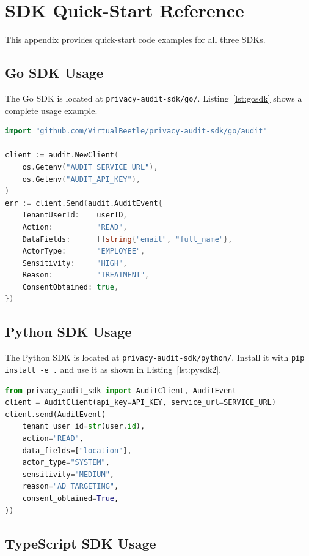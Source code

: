 \documentclass[a4paper,12pt,onecolumn]{report}
\begin{document}
\chapter{SDK Quick-Start Reference}

This appendix provides quick-start code examples for all three SDKs.

\section{Go SDK Usage}

The Go SDK is located at \texttt{privacy-audit-sdk/go/}.
Listing~\ref{lst:gosdk} shows a complete usage example.

\begin{lstlisting}[language=Go, caption={Go SDK initialisation and event submission}, label={lst:gosdk}]
import "github.com/VirtualBeetle/privacy-audit-sdk/go/audit"

client := audit.NewClient(
    os.Getenv("AUDIT_SERVICE_URL"),
    os.Getenv("AUDIT_API_KEY"),
)
err := client.Send(audit.AuditEvent{
    TenantUserId:    userID,
    Action:          "READ",
    DataFields:      []string{"email", "full_name"},
    ActorType:       "EMPLOYEE",
    Sensitivity:     "HIGH",
    Reason:          "TREATMENT",
    ConsentObtained: true,
})
\end{lstlisting}

\section{Python SDK Usage}

The Python SDK is located at \texttt{privacy-audit-sdk/python/}.
Install it with \texttt{pip install -e .} and use it as shown in Listing~\ref{lst:pysdk2}.

\begin{lstlisting}[language=Python, caption={Python SDK event submission}, label={lst:pysdk2}]
from privacy_audit_sdk import AuditClient, AuditEvent
client = AuditClient(api_key=API_KEY, service_url=SERVICE_URL)
client.send(AuditEvent(
    tenant_user_id=str(user.id),
    action="READ",
    data_fields=["location"],
    actor_type="SYSTEM",
    sensitivity="MEDIUM",
    reason="AD_TARGETING",
    consent_obtained=True,
))
\end{lstlisting}

\section{TypeScript SDK Usage}
\end{document}
